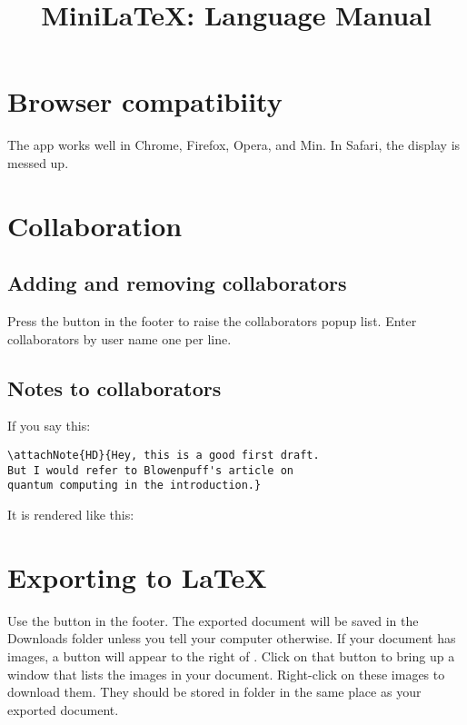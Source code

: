
\title{MiniLaTeX: Language Manual}

\maketitle

\tableofcontents


\section{Browser compatibiity}

The app works well in Chrome, Firefox, Opera, and Min.   In Safari, the display is messed up.

\section{Collaboration}

\subsection{Adding and removing collaborators}

Press the  button in the footer to raise the collaborators popup list.  Enter collaborators by user name one per line.


\subsection{Notes to collaborators}

If you say this:

\begin{verbatim}
\attachNote{HD}{Hey, this is a good first draft.
But I would refer to Blowenpuff's article on
quantum computing in the introduction.}
\end{verbatim}

It is rendered like this:


\section{Exporting to LaTeX}

Use the  button in the footer.  The exported document will be saved in the Downloads folder unless you tell your computer otherwise.  If your document has images, a button  will appear to the right of .  Click on that button to bring up a window that lists the images in your document.  Right-click on these images to download them.  They should be stored in folder  in the same place as your exported document.


